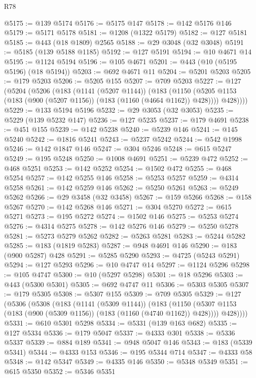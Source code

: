 \begin{lexlean}{R78}
\begin{coremodule}
@5175 := @139 @5174
@5176 := @5175 @147
@5178 := @142 @5176 @146
@5179 := @5171 @5178
@5181 := @1208 (@1322 @5179)
@5182 := @127 @5181
@5185 := @443 (@18 @1809) @2565
@5188 := @29 @3048 (@32 @3048)
@5191 := @5185 (@139 @5188 @1185)
@5192 := @127 @5191
@5194 := @10 @4671 @14
@5195 := @1124 @5194
@5196 := @105 @4671
@5201 := @443 (@10 (@5195 @5196) (@18 @5194))
@5203 := @692 @4671 @11
@5204 := @5201 @5203
@5205 := @179 @5203
@5206 := @5205 @155
@5207 := @709 @5203
@5227 := @127
    (@5204
      (@5206
        (@183
          (@1141 (@5207 @1144))
          (@183
            (@1150 (@5205 @1153 (@183 (@900 (@5207 @1156)) (@183 (@1160 (@4664 @1162)) @428))))
            @428))))
@5229 := @133 @5194 @5196
@5232 := @29 @3053 (@32 @3053)
@5235 := @5229 (@139 @5232 @147)
@5236 := @127 @5235
@5237 := @179 @4691
@5238 := @451 @155
@5239 := @142 @5238
@5240 := @5239 @146
@5241 := @145 @5240
@5242 := @1816 @5241
@5243 := @5237 @5242
@5244 := @542 @1998
@5246 := @142 @1847 @146
@5247 := @304 @5246
@5248 := @615 @5247
@5249 := @195 @5248
@5250 := @1008 @4691
@5251 := @5239 @472
@5252 := @468 @5251
@5253 := @142 @5252
@5254 := @1502 @472
@5255 := @468 @5254
@5257 := @142 @5255 @146
@5258 := @5253 @5257
@5259 := @4314 @5258
@5261 := @142 @5259 @146
@5262 := @5250 @5261
@5263 := @5249 @5262
@5266 := @29 @3458 (@32 @3458)
@5267 := @159 @5266
@5268 := @158 @5267
@5270 := @142 @5268 @146
@5271 := @304 @5270
@5272 := @615 @5271
@5273 := @195 @5272
@5274 := @1502 @146
@5275 := @5253 @5274
@5276 := @4314 @5275
@5278 := @142 @5276 @146
@5279 := @5250 @5278
@5281 := @5273 @5279 @5262
@5282 := @5263 @5281
@5283 := @5244 @5282
@5285 := @183 (@1819 @5283)
@5287 := @948 @4691 @146
@5290 := @183 (@900 @5287) @428
@5291 := @5285 @5290
@5293 := @4725 (@5243 @5291)
@5294 := @127 @5293
@5296 := @10 @4747 @14
@5297 := @1124 @5296
@5298 := @105 @4747
@5300 := @10 (@5297 @5298)
@5301 := @18 @5296
@5303 := @443 (@5300 @5301)
@5305 := @692 @4747 @11
@5306 := @5303 @5305
@5307 := @179 @5305
@5308 := @5307 @155
@5309 := @709 @5305
@5329 := @127
    (@5306
      (@5308
        (@183
          (@1141 (@5309 @1144))
          (@183
            (@1150 (@5307 @1153 (@183 (@900 (@5309 @1156)) (@183 (@1160 (@4740 @1162)) @428))))
            @428))))
@5331 := @610 @5301 @5298
@5334 := @5331 (@139 @163 @682)
@5335 := @127 @5334
@5336 := @179 @5047
@5337 := @4333 @301
@5338 := @5336 @5337
@5339 := @884 @189
@5341 := @948 @5047 @146
@5343 := @183 (@5339 @5341)
@5344 := @4333 @153
@5346 := @195 @5344 @714
@5347 := @4333 @58
@5348 := @142 @5347
@5349 := @4335 @146
@5350 := @5348 @5349
@5351 := @615 @5350
@5352 := @5346 @5351

\end{coremodule}
\end{lexlean}

